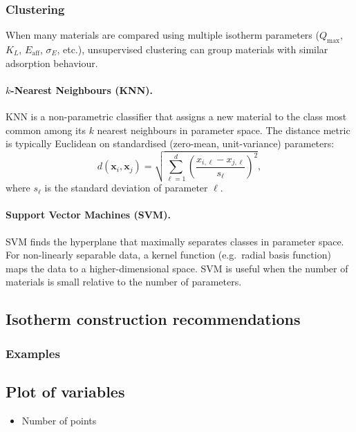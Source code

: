 \documentclass[12pt]{article}
\begin{document}
	\subsubsection{Clustering}

	When many materials are compared using multiple isotherm parameters
	($Q_{\max}$, $K_L$, $E_{\mathrm{aff}}$, $\sigma_E$, etc.),
	unsupervised clustering can group materials with similar adsorption
	behaviour.

	\paragraph{$k$-Nearest Neighbours (KNN).}
	KNN is a non-parametric classifier that assigns a new material to
	the class most common among its $k$ nearest neighbours in
	parameter space. The distance metric is typically Euclidean on
	standardised (zero-mean, unit-variance) parameters:
	\begin{equation}
		d(\mathbf{x}_i, \mathbf{x}_j)
		= \sqrt{\sum_{\ell=1}^{d}
			\left(\frac{x_{i,\ell} - x_{j,\ell}}{s_\ell}\right)^{\!2}},
	\end{equation}
	where $s_\ell$ is the standard deviation of parameter $\ell$.

	\paragraph{Support Vector Machines (SVM).}
	SVM finds the hyperplane that maximally separates classes in
	parameter space. For non-linearly separable data, a kernel
	function (e.g.\ radial basis function) maps the data to a
	higher-dimensional space. SVM is useful when the number of
	materials is small relative to the number of parameters.
	
	\subsection{Isotherm construction recommendations}
	\subsubsection{Examples}
	\subsection{Plot of variables}
	
	\begin{itemize}
		\item Number of points
	\end{itemize}
	
\end{document}
